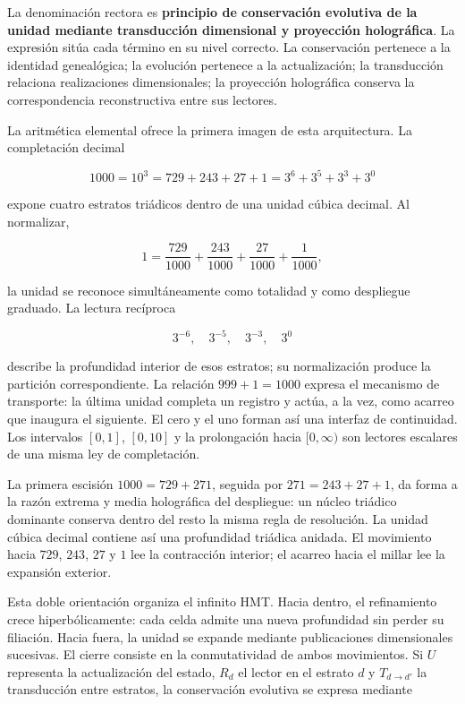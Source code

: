 La denominación rectora es \textbf{principio de conservación evolutiva de la unidad mediante transducción dimensional y proyección holográfica}. La expresión sitúa cada término en su nivel correcto. La conservación pertenece a la identidad genealógica; la evolución pertenece a la actualización; la transducción relaciona realizaciones dimensionales; la proyección holográfica conserva la correspondencia reconstructiva entre sus lectores.

La aritmética elemental ofrece la primera imagen de esta arquitectura. La completación decimal

\[
1000=10^3=729+243+27+1=3^6+3^5+3^3+3^0
\]

expone cuatro estratos triádicos dentro de una unidad cúbica decimal. Al normalizar,

\[
1=\frac{729}{1000}+\frac{243}{1000}+\frac{27}{1000}+\frac{1}{1000},
\]

la unidad se reconoce simultáneamente como totalidad y como despliegue graduado. La lectura recíproca

\[
3^{-6},\quad 3^{-5},\quad 3^{-3},\quad 3^0
\]

describe la profundidad interior de esos estratos; su normalización produce la partición correspondiente. La relación \(999+1=1000\) expresa el mecanismo de transporte: la última unidad completa un registro y actúa, a la vez, como acarreo que inaugura el siguiente. El cero y el uno forman así una interfaz de continuidad. Los intervalos \([0,1]\), \([0,10]\) y la prolongación hacia \([0,\infty)\) son lectores escalares de una misma ley de completación.

La primera escisión \(1000=729+271\), seguida por \(271=243+27+1\), da forma a la razón extrema y media holográfica del despliegue: un núcleo triádico dominante conserva dentro del resto la misma regla de resolución. La unidad cúbica decimal contiene así una profundidad triádica anidada. El movimiento hacia \(729\), \(243\), \(27\) y \(1\) lee la contracción interior; el acarreo hacia el millar lee la expansión exterior.

Esta doble orientación organiza el infinito HMT. Hacia dentro, el refinamiento crece hiperbólicamente: cada celda admite una nueva profundidad sin perder su filiación. Hacia fuera, la unidad se expande mediante publicaciones dimensionales sucesivas. El cierre consiste en la conmutatividad de ambos movimientos. Si \(U\) representa la actualización del estado, \(R_d\) el lector en el estrato \(d\) y \(T_{d\to d'}\) la transducción entre estratos, la conservación evolutiva se expresa mediante

